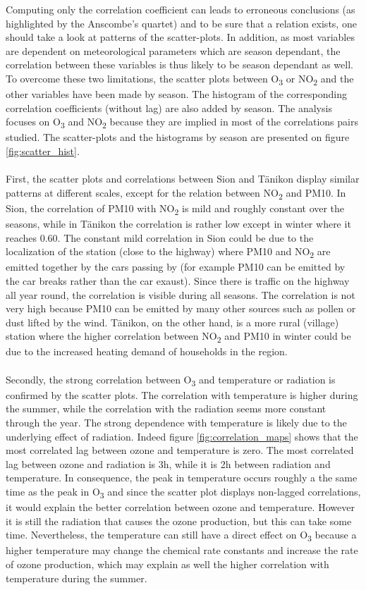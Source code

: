 \documentclass[a4paper, 12pt]{article}
\begin{document}
        Computing only the correlation coefficient can leads to erroneous conclusions (as highlighted by the Anscombe's quartet) and to be sure that a relation exists, one should take a look at patterns of the scatter-plots. In addition, as most variables are dependent on meteorological parameters which are season dependant, the correlation between these variables is thus likely to be season dependant as well. To overcome these two limitations, the scatter plots between O\textsubscript{3} or NO\textsubscript{2} and the other variables have been made by season. The histogram of the corresponding correlation coefficients (without lag) are also added by season. The analysis focuses on O\textsubscript{3} and NO\textsubscript{2} because they are implied in most of the correlations pairs studied. The scatter-plots and the histograms by season are presented on figure \ref{fig:scatter_hist}.
        \\
        \\
        First, the scatter plots and correlations between Sion and Tänikon display similar patterns at different scales, except for the relation between NO\textsubscript{2} and PM10. In Sion, the correlation of PM10 with NO\textsubscript{2} is mild and roughly constant over the seasons, while in Tänikon the correlation is rather low except in winter where it reaches 0.60. The constant mild correlation in Sion could be due to the localization of the station (close to the highway) where PM10 and NO\textsubscript{2} are emitted together by the cars passing by (for example PM10 can be emitted by the car breaks rather than the car exaust). Since there is traffic on the highway all year round, the correlation is visible during all seasons. The correlation is not very high because PM10 can be emitted by many other sources such as pollen or dust lifted by the wind. Tänikon, on the other hand, is a more rural (village) station where the higher correlation between NO\textsubscript{2} and PM10 in winter could be due to the increased heating demand of households in the region. 
        \\
        \\
        Secondly, the strong correlation between O\textsubscript{3} and temperature or radiation is confirmed by the scatter plots. The correlation with temperature is higher during the summer, while the correlation with the radiation seems more constant through the year. The strong dependence with temperature is likely due to the underlying effect of radiation. Indeed figure \ref{fig:correlation_maps} shows that the most correlated lag between ozone and temperature is zero. The most correlated lag between ozone and radiation is 3h, while it is 2h between radiation and temperature. In consequence, the peak in temperature occurs roughly a the same time as the peak in O\textsubscript{3} and since the scatter plot displays non-lagged correlations, it would explain the better correlation between ozone and temperature. However it is still the radiation that causes the ozone production, but this can take some time. Nevertheless, the temperature can still have a direct effect on O\textsubscript{3} because a higher temperature may change the chemical rate constants and increase the rate of ozone production, which may explain as well the higher correlation with temperature during the summer.
\end{document}
